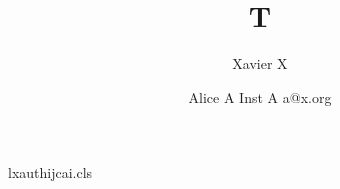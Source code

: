 \begin{filecontents*}[overwrite]{lxauthijcai.cls}
\renewcommand\author[1]{\g@addto@macro\@author{\and #1}}
\newcommand\affil[1]{\g@addto@macro\@author{\\#1}}
\end{filecontents*}
\documentclass{lxauthijcai}

\title{T}
\author{Xavier X}
\author{Alice A \affiliations Inst A \emails a@x.org}
\maketitle
Body.

